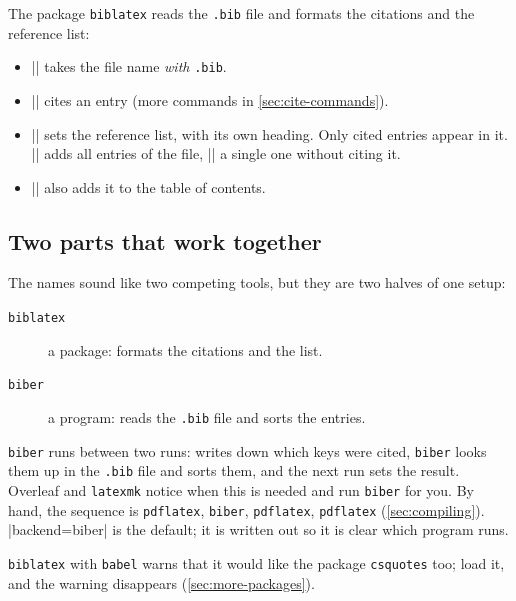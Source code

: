 The package \texttt{biblatex} reads the \texttt{.bib} file and formats the citations and the reference list:


\begin{itemize}
    \item \code|| takes the file name \emph{with} \texttt{.bib}.
    \item \code|\cite{key}| cites an entry (more commands in \autoref{sec:cite-commands}).
    \item \code|\printbibliography| sets the reference list, with its own heading.
        Only cited entries appear in it.
        \code|\nocite{*}| adds all entries of the file, \code|\nocite{key}| a single one without citing it.
    \item \code|\printbibliography[heading=bibintoc]| also adds it to the table of contents.
\end{itemize}

\subsection{Two parts that work together}

The names sound like two competing tools, but they are two halves of one setup:

\begin{description}
    \item[\texttt{biblatex}] a  package: formats the citations and the list.
    \item[\texttt{biber}] a program: reads the \texttt{.bib} file and sorts the entries.
\end{description}

\texttt{biber} runs between two  runs:
 writes down which keys were cited,
\texttt{biber} looks them up in the \texttt{.bib} file and sorts them,
and the next  run sets the result.
Overleaf and \texttt{latexmk} notice when this is needed and run \texttt{biber} for you.
By hand, the sequence is \texttt{pdflatex}, \texttt{biber}, \texttt{pdflatex}, \texttt{pdflatex} (\autoref{sec:compiling}).
\code|backend=biber| is the default; it is written out so it is clear which program runs.

\texttt{biblatex} with \texttt{babel} warns that it would like the package \texttt{csquotes} too;
load it, and the warning disappears (\autoref{sec:more-packages}).

